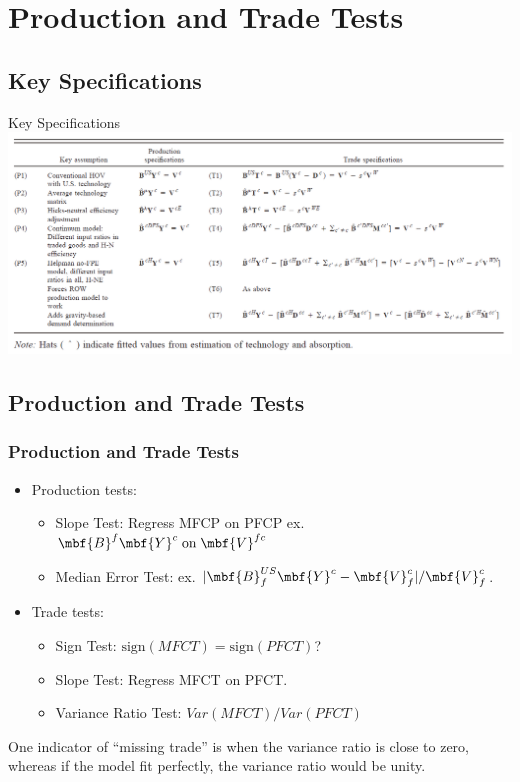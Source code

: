 \documentclass[xcolor=svgnames,10pt]{beamer}
\begin{document}
\section{Production and Trade Tests}
\subsection{Key Specifications}
\begin{frame}[c]{Key Specifications}
\centering
\includegraphics[width=\textwidth]{spec.png}
\end{frame}

\subsection{Production and Trade Tests}
\begin{frame}[c]\frametitle{Production and Trade Tests}
\begin{itemize}
\item Production tests:
    \begin{itemize}
    \item Slope Test: Regress MFCP on PFCP \quad ex. \quad \ $\mbf{B}^{f}\mbf{Y}^{c} \text{\;on\;} \mbf{V}^{fc}$ \\
    \item Median Error Test: ex. $|\mbf{B}_{f}^{US}\mbf{Y}^{c}-\mbf{V}_{f}^{c}|/\mbf{V}_{f}^{c}$.
    \end{itemize}
\item Trade tests:
    \begin{itemize}
        \item Sign Test: $\text{sign}(MFCT) = \text{sign}(PFCT)$?
        \item Slope Test: Regress MFCT on PFCT.
        \item Variance Ratio Test: $Var(MFCT)/Var(PFCT)$
    \end{itemize}
\end{itemize}
One indicator of ``missing trade'' is when the variance ratio is close to zero, whereas if the model fit perfectly, the variance ratio would be unity.
\end{frame}
\end{document}

